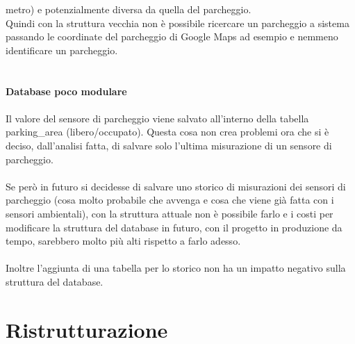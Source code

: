 metro) e potenzialmente diversa da quella del parcheggio. 
\\
Quindi con la struttura vecchia non è possibile ricercare un parcheggio a sistema passando le coordinate del parcheggio di Google
Maps ad esempio e nemmeno identificare un parcheggio.
\\\\\\
\textbf{Database poco modulare}
\\\\
Il valore del sensore di parcheggio viene salvato all'interno della tabella parking\_area (libero/occupato). Questa cosa non crea problemi ora che 
si è deciso, dall'analisi fatta, di salvare solo l'ultima misurazione di un sensore di parcheggio.
\\\\
Se però in futuro si decidesse di salvare uno storico di misurazioni dei sensori di parcheggio (cosa molto probabile che
avvenga e cosa che viene già fatta con i sensori ambientali), con la struttura attuale non è possibile farlo e i costi
per modificare la struttura del database in futuro, con il progetto in produzione da tempo, sarebbero molto più
alti rispetto a farlo adesso.
\\\\
Inoltre l'aggiunta di una tabella per lo storico non ha un impatto negativo sulla struttura del database.
\clearpage
\section{Ristrutturazione}

